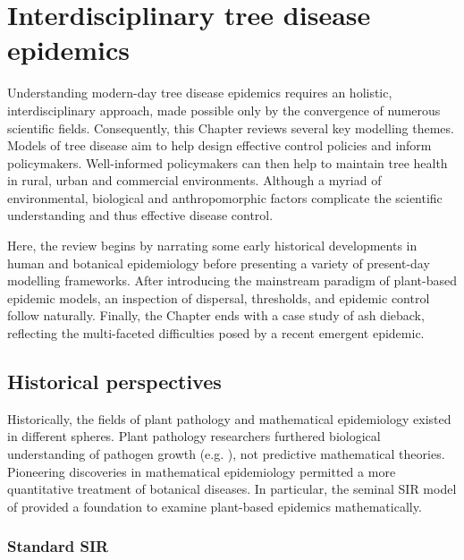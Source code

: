 \chapter{Interdisciplinary tree disease epidemics}
\label{chapter2:litreview} 

Understanding modern-day tree disease epidemics requires an holistic, interdisciplinary
approach, made possible only by the convergence of numerous scientific fields. 
Consequently, this Chapter reviews several key modelling themes.
Models of tree disease aim to help design effective control policies and inform policymakers.
Well-informed policymakers can then help to maintain tree health in rural, urban and commercial environments. 
Although a myriad of environmental, biological and anthropomorphic factors complicate the scientific understanding 
and thus effective disease control. 

Here, the review begins by narrating some early historical developments in human and botanical epidemiology before presenting
a variety of present-day modelling frameworks. After introducing the mainstream paradigm of plant-based epidemic models,
an inspection of dispersal, thresholds, and epidemic control follow naturally. Finally, the Chapter ends with a case study of ash dieback, reflecting the multi-faceted 
difficulties posed by a recent emergent epidemic.

\newpage

\section{Historical perspectives}

Historically, the fields of plant pathology and mathematical epidemiology existed in different spheres.
Plant pathology researchers furthered biological understanding of pathogen growth (e.g. \cite{doi:10.1146/annurev.py.01.090163.000245}), not predictive mathematical theories.
Pioneering discoveries in mathematical epidemiology permitted a more quantitative treatment of botanical diseases. 
In particular, the seminal SIR model of \cite{kermack-model} 
provided a foundation to examine plant-based epidemics mathematically.

\subsection{Standard SIR}

